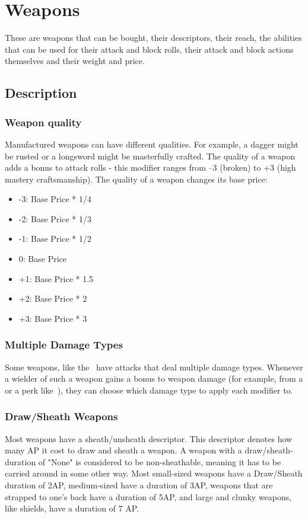 \chapter{Weapons}\label{ch:weapons}
These are weapons that can be bought, their descriptors, their reach, the abilities that can be used for their attack and block rolls, their attack and block actions themselves and their weight and price.\\
\section{Description}\label{sec:weaponDescription}
\subsection{Weapon quality}\label{subsec:weaponQuality}
Manufactured weapons can have different qualities.
For example, a dagger might be rusted or a longsword might be masterfully crafted.
The quality of a weapon adds a bonus to attack rolls - this modifier ranges from --3 (broken) to +3 (high mastery craftsmanship).
The quality of a weapon changes its base price:\\

\begin{itemize}
    \item -3: Base Price * 1/4
    \item -2: Base Price * 1/3
    \item -1: Base Price * 1/2
    \item 0: Base Price
    \item +1: Base Price * 1.5
    \item +2: Base Price * 2
    \item +3: Base Price * 3
\end{itemize}

\subsection{Multiple Damage Types}\label{subsec:multipleDamageTypeWeapons}
Some weapons, like the~ have attacks that deal multiple damage types.
Whenever a wielder of such a weapon gains a bonus to weapon damage (for example, from a or a perk like~), they can choose which damage type to apply each modifier to.

\subsection{Draw/Sheath Weapons}\label{subsec:sheathWeapons}
Most weapons have a sheath/unsheath descriptor.
This descriptor denotes how many AP it cost to draw and sheath a weapon.
A weapon with a draw/sheath-duration of "None" is considered to be non-sheathable, meaning it has to be carried around in some other way.
Most small-sized weapons have a Draw/Sheath duration of 2AP, medium-sized have a duration of 3AP, weapons that are strapped to one's back have a duration of 5AP, and large and clunky weapons, like shields, have a duration of 7 AP.

